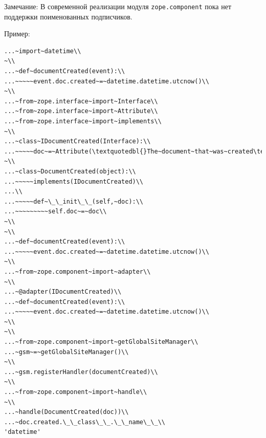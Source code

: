 \documentclass[a4paper,openany,twoside,draft]{book}
\begin{document}
Замечание: В современной реализации модуля \texttt{zope.component} пока нет
поддержки поименованных подписчиков.

Пример:

\begin{verbatim}
...~import~datetime\\
~\\
...~def~documentCreated(event):\\
...~~~~~event.doc.created~=~datetime.datetime.utcnow()\\
~\\
...~from~zope.interface~import~Interface\\
...~from~zope.interface~import~Attribute\\
...~from~zope.interface~import~implements\\
~\\
...~class~IDocumentCreated(Interface):\\
...~~~~~doc~=~Attribute(\textquotedbl{}The~document~that~was~created\textquotedbl{})\\
~\\
...~class~DocumentCreated(object):\\
...~~~~~implements(IDocumentCreated)\\
...\\
...~~~~~def~\_\_init\_\_(self,~doc):\\
...~~~~~~~~~self.doc~=~doc\\
~\\
~\\
...~def~documentCreated(event):\\
...~~~~~event.doc.created~=~datetime.datetime.utcnow()\\
~\\
...~from~zope.component~import~adapter\\
~\\
...~@adapter(IDocumentCreated)\\
...~def~documentCreated(event):\\
...~~~~~event.doc.created~=~datetime.datetime.utcnow()\\
~\\
~\\
...~from~zope.component~import~getGlobalSiteManager\\
...~gsm~=~getGlobalSiteManager()\\
~\\
...~gsm.registerHandler(documentCreated)\\
~\\
...~from~zope.component~import~handle\\
~\\
...~handle(DocumentCreated(doc))\\
...~doc.created.\_\_class\_\_.\_\_name\_\_\\
'datetime'
\end{verbatim}
\end{document}
